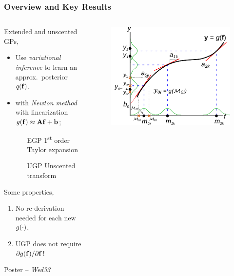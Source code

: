 \documentclass{beamer}
\begin{document}
\begin{frame}
    \frametitle{Overview and Key Results}


\vspace{-8mm}
\begin{columns}

\begin{column}{0.45\linewidth}

Extended and unscented GPs,
\begin{itemize}
    \footnotesize
    \item Use \emph{variational inference} to learn an approx.\ posterior 
        $q\!\left({\mathbf{f}}\right)$,
    \item with \emph{Newton method} with linearization
        $g\!\left({{\mathbf{f}}}\right) \approx \mathbf{A}\mathbf{f} + \mathbf{b}$;
    \begin{itemize}
        \footnotesize
        \item[EGP] 1\textsuperscript{st} order Taylor expansion
        \item[UGP] Unscented transform
    \end{itemize}
\end{itemize}

\vspace{3mm}
Some properties,
\begin{enumerate}
    \footnotesize
    \item No re-derivation needed for each new $g\!\left({{\cdot}}\right)$,
    \item UGP does not require $\partial g\!\left({{\mathbf{f}}}\right)\!/\partial{\ensuremath{\mathbf{f}}}$!
\end{enumerate}

\begin{block}{}
    \centering
    Poster -- \emph{Wed33}
\end{block}

\end{column}

\begin{column}{0.55\linewidth}

\begin{figure}
    \includegraphics[width=0.65\linewidth]{fig/statlin_gp}


\end{figure}
\end{column}
\end{columns}
\end{frame}
\end{document}
